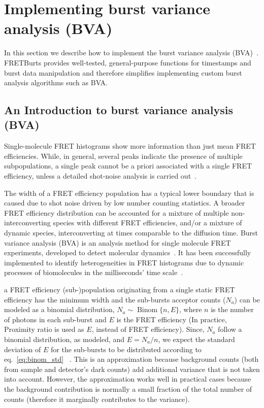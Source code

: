 \section{Implementing burst variance analysis (BVA)}


\label{sec:bva}
In this section we describe how to implement the burst variance analysis (BVA)~\cite{Torella_2011}.
FRETBurts provides well-tested, general-purpose functions for timestamps and burst data 
manipulation and therefore simplifies implementing custom burst analysis algorithms such as BVA.

\subsection{An Introduction to burst variance analysis (BVA)}
Single-molecule FRET histograms show more information than just mean FRET efficiencies. 
While, in general, several peaks indicate the presence of multiple subpopulations, 
a single peak cannot be a priori associated with a single FRET efficiency,
unless a detailed shot-noise analysis is carried out~\cite{Nir_2006,Antonik2006}.

The width of a FRET efficiency population has a typical lower boundary that is caused due to shot noise driven by low number counting statistics. A broader FRET efficiency distribution can be accounted for a mixture of multiple non-interconverting species with different FRET efficiencies, and/or a mixture of dynamic species, interconverting at times comparable to the diffusion time. Burst variance analysis (BVA) is an analysis method for single molecule FRET experiments, developed to detect molecular dynamics~\cite{Torella_2011}. It has been successfully implemented to identify heterogeneities in FRET histograms due to dynamic processes of biomolecules in the milliseconds' time scale~\cite{Torella_2011, Robb_2013}.

a FRET efficiency (sub-)population originating from a single static FRET efficiency has the minimum width and the sub-bursts acceptor counts ($N_a$) can be modeled as a binomial distribution, 
$N_a \sim \operatorname{Binom} \{n, E\}$, where $n$ is the number of photons in each sub-burst and 
$E$ is the FRET efficiency (In practice, Proximity ratio is used as $E$, instead of FRET efficiency). Since, $N_a$ follow a binomial distribution, as modeled, and $E = N_a/n$, we expect the standard deviation of $E$ for the sub-bursts to be distributed according to eq.~\ref{eq:binom_std} ~\cite{Torella_2011}. 
This is an approximation because background counts (both from sample and detector's dark counts) add additional variance that is not taken into account. However, the approximation works well in practical cases because the background contribution
is normally a small fraction of the total number of counts (therefore it marginally contributes to the variance).

